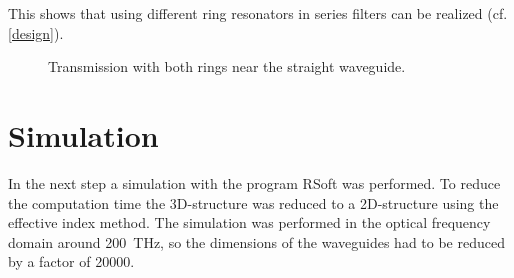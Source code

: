 This shows that using different ring resonators in series filters can be realized (cf. \ref{design}).


\begin{figure}%
\centering
\caption{Transmission with both rings near the straight waveguide.}%
\label{fig:07}%
\end{figure}

\chapter{Simulation}
In the next step a simulation with the program RSoft was performed. To reduce the computation time the 3D-structure was reduced to a 2D-structure using the effective index method. The simulation was performed in the optical frequency domain around 200~THz, so the dimensions of the waveguides had to be reduced by a factor of 20000. 

